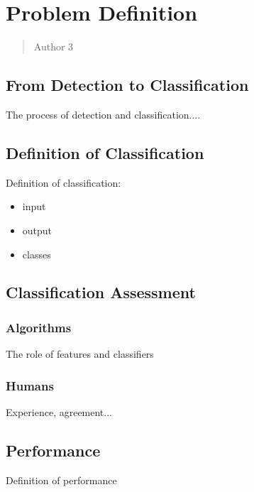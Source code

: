 \chapter{Problem Definition}
\label{chapter3}
\thispagestyle{empty}

\begin{quotation}
{\footnotesize
{}
\begin{flushright}
Author 3
\end{flushright}
}
\end{quotation}

\vspace{0.5cm}


\section{From Detection to Classification}

The process of detection and classification....

\vspace{0.5cm}

\section{Definition of Classification}

Definition of classification:
\begin{itemize}
\item input
\item output
\item classes
\end{itemize}

\vspace{0.5cm}

\section{Classification Assessment}

\subsection{Algorithms}

The role of features and classifiers

\subsection{Humans}

Experience, agreement...

\vspace{0.5cm}

\section{Performance}

Definition of performance